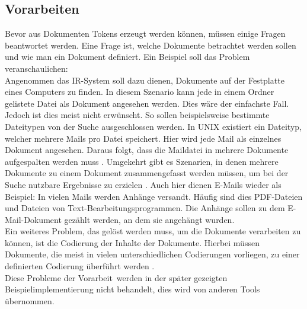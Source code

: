 \subsection{Vorarbeiten}
Bevor aus Dokumenten Tokens erzeugt werden können, müssen einige Fragen beantwortet werden.
Eine Frage ist, welche Dokumente betrachtet werden sollen und wie man ein Dokument definiert. Ein Beispiel soll das Problem veranschaulichen:
\\
Angenommen das IR-System soll dazu dienen, Dokumente auf der Festplatte eines Computers zu finden. In diesem Szenario kann jede in einem Ordner gelistete Datei als Dokument angesehen werden. Dies wäre der einfachste Fall. Jedoch ist dies meist nicht erwünscht. So sollen beispielsweise bestimmte Dateitypen von der Suche ausgeschlossen werden. In UNIX existiert ein Dateityp, welcher mehrere Mails pro Datei speichert. Hier wird jede Mail als einzelnes Dokument angesehen. Daraus folgt, dass die Maildatei in mehrere Dokumente aufgespalten werden muss \cite{IR_Intro_Cambridge}.
Umgekehrt gibt es Szenarien, in denen mehrere Dokumente zu einem Dokument zusammengefasst werden müssen, um bei der Suche nutzbare Ergebnisse zu erzielen \cite{IR_Intro_Cambridge}. Auch hier dienen E-Mails wieder als Beispiel: In vielen Mails werden Anhänge versandt. Häufig sind dies PDF-Dateien und Dateien von Text-Bearbeitungsprogrammen. Die Anhänge sollen zu dem E-Mail-Dokument gezählt werden, an dem sie angehängt wurden.
\\
Ein weiteres Problem, das gelöst werden muss, um die Dokumente verarbeiten zu können, ist die Codierung der Inhalte der Dokumente. Hierbei müssen Dokumente, die meist in vielen unterschiedlichen Codierungen vorliegen, zu einer definierten Codierung überführt werden \cite{IR_Intro_Cambridge}.
\\
Diese Probleme der \glqq Vorarbeit\grqq\ werden in der später gezeigten Beispielimplementierung nicht behandelt, dies wird von anderen Tools übernommen.

